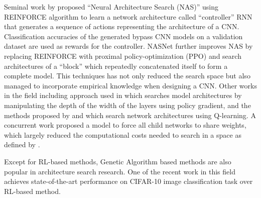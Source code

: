 \documentclass[runningheads]{llncs}
\begin{document}
Seminal work by \cite{zoph2016neural} proposed ``Neural Architecture Search (NAS)'' using REINFORCE algorithm \cite{Williams:1992:SSG:139611.139614} to learn a network architecture called ``controller'' RNN that generates a sequence of actions representing the architecture of a CNN. Classification accuracies of the generated bypass CNN models on a validation dataset are used as rewards for the controller. NASNet \cite{zoph2017learning} further improves NAS by replacing REINFORCE with proximal policy-optimization (PPO) \cite{schulman2017proximal} and search architectures of a ``block'' which repeatedly concatenated itself to form a complete model. This techniques has not only reduced the search space but also managed to incorporate empirical knowledge when designing a CNN. Other works in the field including approach used in \cite{cai2018efficient} which searches model architectures by manipulating the depth of the width of the layers using policy gradient, and the methods proposed by \cite{baker2016designing} and \cite{zhong2017practical} which search network architectures using Q-learning. A concurrent work \cite{pham2018efficient} proposed a model to force all child networks to share weights, which largely reduced the computational costs needed to search in a space as defined by \cite{zoph2017learning}.

Except for RL-based methods, Genetic Algorithm based methods \cite{real2017large,xie2017genetic,liu2017hierarchical} are also popular in architecture search research. One of the recent work in this field \cite{real2018regularized} achieves state-of-the-art performance on CIFAR-10 image classification task over RL-based method.
\end{document}
